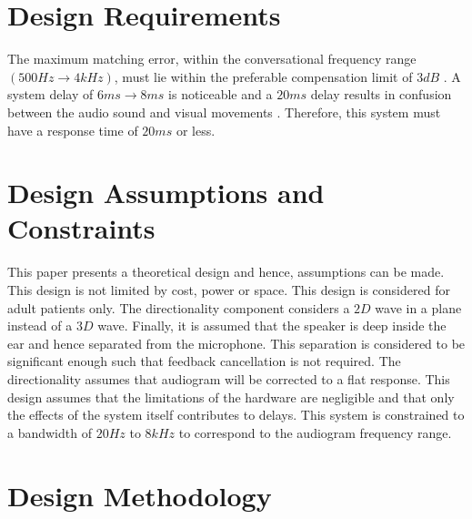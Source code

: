 \documentclass[11pt,onecolumn]{witseiepaper}
\begin{document}
\section{Design Requirements}
\label{sec:req}

\noindent The maximum matching error, within the conversational frequency range $(500Hz \rightarrow 4kHz)$, must lie within the preferable compensation limit of $3dB$ \cite{chang}. A system delay of $6ms \rightarrow 8ms$ is noticeable and a $20ms$ delay results in confusion between the audio sound and visual movements \cite{brennan}. Therefore, this system must have a response time of $20ms$ or less.  

\section{Design Assumptions and Constraints}
\label{sec:assCons}

\noindent This paper presents a theoretical design and hence, assumptions can be made. This design is not limited by cost, power or space. This design is considered for adult patients only. The directionality component considers a $2D$ wave in a plane instead of a $3D$ wave. Finally, it is assumed that the speaker is deep inside the ear and hence separated from the microphone. This separation is considered to be significant enough such that feedback cancellation is not required. The directionality assumes that audiogram will be corrected to a flat response. This design assumes that the limitations of the hardware are negligible and that only the effects of the system itself contributes to delays. This system is constrained to a bandwidth of $20Hz$ to $8kHz$ to correspond to the audiogram frequency range. 

\section{Design Methodology}
\end{document}
